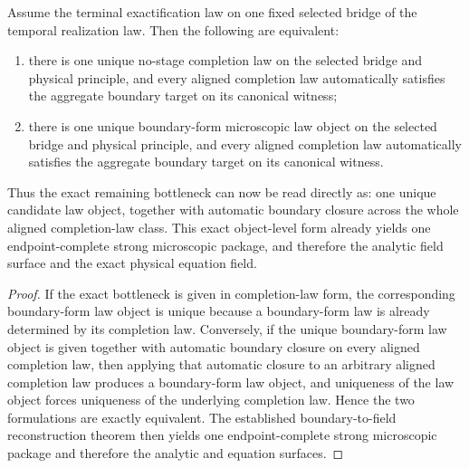 \begin{theorem}
\label{thm:canonical-boundary-microscopic-law-object-fill-target}
Assume the terminal exactification law on one fixed selected bridge of the
temporal realization law. Then the following are equivalent:
\begin{enumerate}
\item there is one unique no-stage completion law on the selected bridge and
physical principle, and every aligned completion law automatically satisfies
the aggregate boundary target on its canonical witness;
\item there is one unique boundary-form microscopic law object on the
selected bridge and physical principle, and every aligned completion law
automatically satisfies the aggregate boundary target on its canonical
witness.
\end{enumerate}
Thus the exact remaining bottleneck can now be read directly as:
one unique candidate law object, together with automatic boundary closure
across the whole aligned completion-law class. This exact object-level form
already yields one endpoint-complete strong microscopic package, and therefore
the analytic field surface and the exact physical equation field.
\end{theorem}

\begin{proof}
If the exact bottleneck is given in completion-law form, the corresponding
boundary-form law object is unique because a boundary-form law is already
determined by its completion law. Conversely, if the unique boundary-form law
object is given together with automatic boundary closure on every aligned
completion law, then applying that automatic closure to an arbitrary aligned
completion law produces a boundary-form law object, and uniqueness of the law
object forces uniqueness of the underlying completion law. Hence the two
formulations are exactly equivalent. The established boundary-to-field
reconstruction theorem then yields one endpoint-complete strong microscopic
package and therefore the analytic and equation surfaces.
\end{proof}

